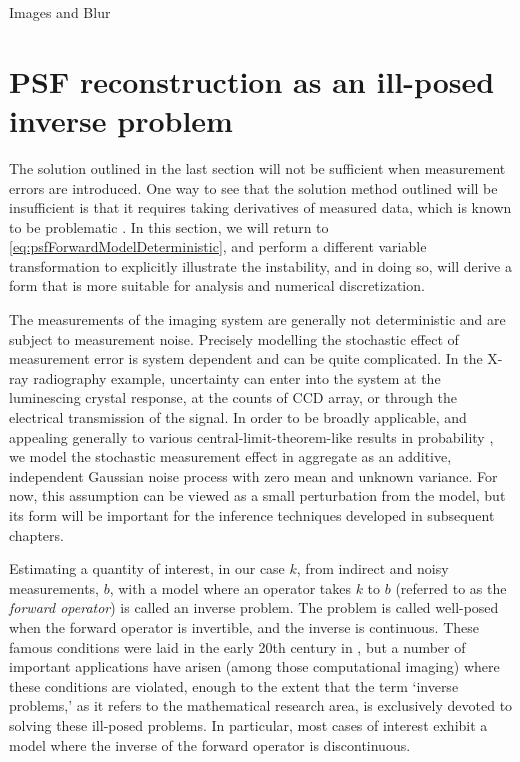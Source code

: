 \begin{chapter}{Images and Blur}
\section{PSF reconstruction as an ill-posed inverse problem}
  
  The solution outlined in the last section will not be sufficient when measurement errors are introduced. 
  One way to see that the solution method outlined will be insufficient is that it requires taking derivatives of measured data, which is known to be problematic \citep{hanke2001}.
  In this section, we will return to \eqref{eq:psfForwardModelDeterministic}, and perform a different variable transformation to explicitly illustrate the instability, and in doing so, will derive a form that is more suitable for analysis and numerical discretization.

  The measurements of the imaging system are generally not deterministic and are subject to measurement noise.
  Precisely modelling the stochastic effect of measurement error is system dependent and can be quite complicated.
  In the X-ray radiography example, uncertainty can enter into the system at the luminescing crystal response, at the counts of CCD array, or through the electrical transmission of the signal.
  In order to be broadly applicable, and appealing generally to various central-limit-theorem-like results in probability \citep{durrett2010probability}, we model the stochastic measurement effect in aggregate as an additive, independent Gaussian noise process with zero mean and unknown variance.  
  For now, this assumption can be viewed as a small perturbation from the model, but its form will be important for the inference techniques developed in subsequent chapters.

  Estimating a quantity of interest, in our case $k$, from indirect and noisy measurements, $b$, with a model where an operator takes $k$ to $b$ (referred to as the \emph{forward operator}) is called an inverse problem.  
  The problem is called well-posed when the forward operator is invertible, and the inverse is continuous. %
  These famous conditions were laid in the early 20th century in \citep{hadamard1902}, but a number of important applications have arisen (among those computational imaging) where these conditions are violated, enough to the extent that the term `inverse problems,' as it refers to the mathematical research area, is exclusively devoted to solving these ill-posed problems.
  In particular, most cases of interest %
  exhibit a model where the inverse of the forward operator is discontinuous.


\end{chapter}
